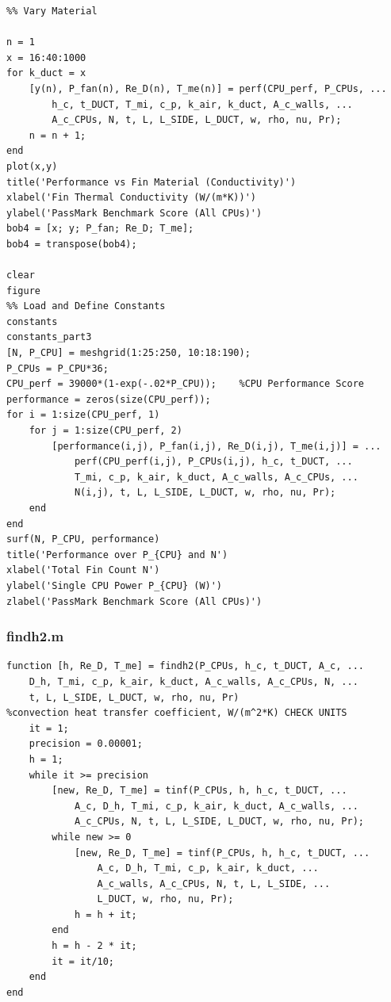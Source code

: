 \documentclass[12pt, titlepage]{article}
\begin{document}
\begin{verbatim}
%% Vary Material

n = 1
x = 16:40:1000
for k_duct = x
    [y(n), P_fan(n), Re_D(n), T_me(n)] = perf(CPU_perf, P_CPUs, ...
        h_c, t_DUCT, T_mi, c_p, k_air, k_duct, A_c_walls, ...
        A_c_CPUs, N, t, L, L_SIDE, L_DUCT, w, rho, nu, Pr);
    n = n + 1;
end
plot(x,y)
title('Performance vs Fin Material (Conductivity)')
xlabel('Fin Thermal Conductivity (W/(m*K))')
ylabel('PassMark Benchmark Score (All CPUs)')
bob4 = [x; y; P_fan; Re_D; T_me];
bob4 = transpose(bob4);

clear
figure
%% Load and Define Constants
constants
constants_part3
[N, P_CPU] = meshgrid(1:25:250, 10:18:190);
P_CPUs = P_CPU*36;
CPU_perf = 39000*(1-exp(-.02*P_CPU));    %CPU Performance Score
performance = zeros(size(CPU_perf));
for i = 1:size(CPU_perf, 1)
    for j = 1:size(CPU_perf, 2)
        [performance(i,j), P_fan(i,j), Re_D(i,j), T_me(i,j)] = ...
            perf(CPU_perf(i,j), P_CPUs(i,j), h_c, t_DUCT, ...
            T_mi, c_p, k_air, k_duct, A_c_walls, A_c_CPUs, ...
            N(i,j), t, L, L_SIDE, L_DUCT, w, rho, nu, Pr);
    end
end
surf(N, P_CPU, performance)
title('Performance over P_{CPU} and N')
xlabel('Total Fin Count N')
ylabel('Single CPU Power P_{CPU} (W)')
zlabel('PassMark Benchmark Score (All CPUs)')

\end{verbatim}
\subsubsection{findh2.m}
\begin{verbatim}
function [h, Re_D, T_me] = findh2(P_CPUs, h_c, t_DUCT, A_c, ...
    D_h, T_mi, c_p, k_air, k_duct, A_c_walls, A_c_CPUs, N, ...
    t, L, L_SIDE, L_DUCT, w, rho, nu, Pr)
%convection heat transfer coefficient, W/(m^2*K) CHECK UNITS
    it = 1;
    precision = 0.00001;
    h = 1;
    while it >= precision
        [new, Re_D, T_me] = tinf(P_CPUs, h, h_c, t_DUCT, ...
            A_c, D_h, T_mi, c_p, k_air, k_duct, A_c_walls, ...
            A_c_CPUs, N, t, L, L_SIDE, L_DUCT, w, rho, nu, Pr);
        while new >= 0
            [new, Re_D, T_me] = tinf(P_CPUs, h, h_c, t_DUCT, ...
                A_c, D_h, T_mi, c_p, k_air, k_duct, ...
                A_c_walls, A_c_CPUs, N, t, L, L_SIDE, ...
                L_DUCT, w, rho, nu, Pr);
            h = h + it;
        end
        h = h - 2 * it;
        it = it/10;
    end
end

\end{verbatim}
\end{document}
